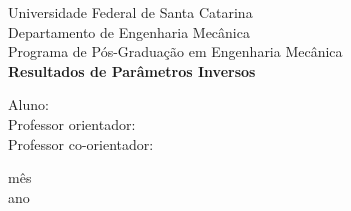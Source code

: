 \documentclass[a4paper, 12pt]{article}
\begin{document}

\begin{titlepage}
	\begin{center}
	

		\Huge{Universidade Federal de Santa Catarina}\\
		\large{Departamento de Engenharia Mecânica}\\ 
		\large{Programa de Pós-Graduação em Engenharia Mecânica}\\ 
		\vspace{15pt}
        \vspace{95pt}
        \textbf{\LARGE{Resultados de Parâmetros Inversos}}\\
		\vspace{3,5cm}
	\end{center}
	
	\begin{flushleft}
		\begin{tabbing}
			Aluno: \\
			Professor orientador: \\
			Professor co-orientador: \\
	\end{tabbing}
 \end{flushleft}
	\vspace{1cm}
	
	\begin{center}
		\vspace{\fill}
			 mês\\
		 ano
			\end{center}
\end{titlepage}

\newpage
\tableofcontents
\thispagestyle{empty}

\newpage
{}
\newpage

\end{document}
